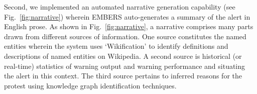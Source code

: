 
Second, we implemented an automated narrative generation capability
(see Fig.~\ref{fig:narrative}) wherein EMBERS auto-generates a summary
of the alert in English prose. As shown in Fig.~\ref{fig:narrative},
a narrative comprises many parts drawn from different sources
of information. One source constitutes the named entities wherein the
system uses
`Wikification' to identify definitions and descriptions of 
named entities on Wikipedia. A second source is historical (or real-time)
statistics of warning output and warning performance and situating the
alert in this context. The third source pertains to inferred reasons for
the protest using knowledge graph identification techniques.

